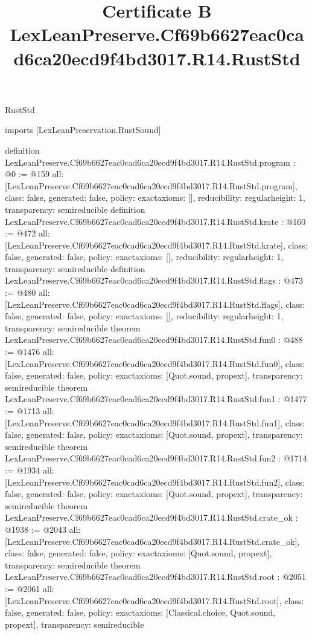 \begin{lexlean}{RustStd}
\title{Certificate B LexLeanPreserve.Cf69b6627eac0cad6ca20ecd9f4bd3017.R14.RustStd}
\begin{coremodule}
imports [LexLeanPreservation.RustSound]

definition LexLeanPreserve.Cf69b6627eac0cad6ca20ecd9f4bd3017.R14.RustStd.program : @0 := @159 {
  all: [LexLeanPreserve.Cf69b6627eac0cad6ca20ecd9f4bd3017.R14.RustStd.program],
  class: false,
  generated: false,
  policy: exact{axioms: []},
  reducibility: regular{height: 1},
  transparency: semireducible
}
definition LexLeanPreserve.Cf69b6627eac0cad6ca20ecd9f4bd3017.R14.RustStd.krate : @160 := @472 {
  all: [LexLeanPreserve.Cf69b6627eac0cad6ca20ecd9f4bd3017.R14.RustStd.krate],
  class: false,
  generated: false,
  policy: exact{axioms: []},
  reducibility: regular{height: 1},
  transparency: semireducible
}
definition LexLeanPreserve.Cf69b6627eac0cad6ca20ecd9f4bd3017.R14.RustStd.flags : @473 := @480 {
  all: [LexLeanPreserve.Cf69b6627eac0cad6ca20ecd9f4bd3017.R14.RustStd.flags],
  class: false,
  generated: false,
  policy: exact{axioms: []},
  reducibility: regular{height: 1},
  transparency: semireducible
}
theorem LexLeanPreserve.Cf69b6627eac0cad6ca20ecd9f4bd3017.R14.RustStd.fun0 : @488 := @1476 {
  all: [LexLeanPreserve.Cf69b6627eac0cad6ca20ecd9f4bd3017.R14.RustStd.fun0],
  class: false,
  generated: false,
  policy: exact{axioms: [Quot.sound, propext]},
  transparency: semireducible
}
theorem LexLeanPreserve.Cf69b6627eac0cad6ca20ecd9f4bd3017.R14.RustStd.fun1 : @1477 := @1713 {
  all: [LexLeanPreserve.Cf69b6627eac0cad6ca20ecd9f4bd3017.R14.RustStd.fun1],
  class: false,
  generated: false,
  policy: exact{axioms: [Quot.sound, propext]},
  transparency: semireducible
}
theorem LexLeanPreserve.Cf69b6627eac0cad6ca20ecd9f4bd3017.R14.RustStd.fun2 : @1714 := @1934 {
  all: [LexLeanPreserve.Cf69b6627eac0cad6ca20ecd9f4bd3017.R14.RustStd.fun2],
  class: false,
  generated: false,
  policy: exact{axioms: [Quot.sound, propext]},
  transparency: semireducible
}
theorem LexLeanPreserve.Cf69b6627eac0cad6ca20ecd9f4bd3017.R14.RustStd.crate_ok : @1938 := @2043 {
  all: [LexLeanPreserve.Cf69b6627eac0cad6ca20ecd9f4bd3017.R14.RustStd.crate_ok],
  class: false,
  generated: false,
  policy: exact{axioms: [Quot.sound, propext]},
  transparency: semireducible
}
theorem LexLeanPreserve.Cf69b6627eac0cad6ca20ecd9f4bd3017.R14.RustStd.root : @2051 := @2061 {
  all: [LexLeanPreserve.Cf69b6627eac0cad6ca20ecd9f4bd3017.R14.RustStd.root],
  class: false,
  generated: false,
  policy: exact{axioms: [Classical.choice, Quot.sound, propext]},
  transparency: semireducible
}


\end{coremodule}
\end{lexlean}
